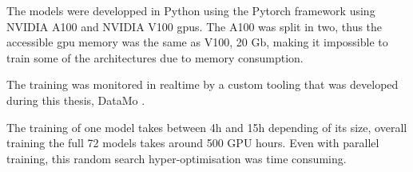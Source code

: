 \documentclass[../main.tex]{subfiles}
\begin{document}
{{\hfill

The models were developped in Python using the Pytorch framework \cite{ansel_pytorch_2024} using  NVIDIA A100 \cite{noauthor_nvidia_nodate-1} and NVIDIA V100 \cite{noauthor_nvidia_nodate-2} gpus. The A100 was split in two, thus the accessible gpu memory was the same as V100, 20 Gb, making it impossible to train some of the architectures due to memory consumption.

The training was monitored in realtime by a custom tooling that was developed during this thesis, DataMo \cite{imbert_leonard-imbertdatamo_2024}.

The training of one model takes between 4h and 15h depending of its size, overall training the full 72 models takes around 500 GPU hours. Even with parallel training, this random search hyper-optimisation was time consuming.



}}
\end{document}
